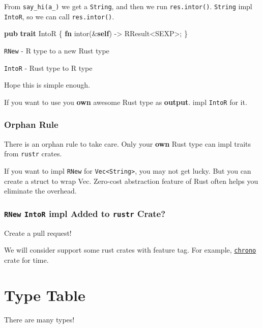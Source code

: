 \documentclass[]{book}
\newenvironment{Shaded}{\begin{snugshade}}{\end{snugshade}}
\newcommand{\KeywordTok}[1]{\textcolor[rgb]{0.13,0.29,0.53}{\textbf{{#1}}}}
\newcommand{\NormalTok}[1]{{#1}}
\begin{document}
From \texttt{say\_hi(a\_)} we get a \texttt{String}, and then we run
\texttt{res.intor()}. \texttt{String} impl \texttt{IntoR}, so we can
call \texttt{res.intor()}.

\begin{Shaded}
\begin{Highlighting}[]
\KeywordTok{pub} \KeywordTok{trait} \NormalTok{IntoR \{}
    \KeywordTok{fn} \NormalTok{intor(&}\KeywordTok{self}\NormalTok{) -> RResult<SEXP>;}
\NormalTok{\}}
\end{Highlighting}
\end{Shaded}

\texttt{RNew} - R type to a new Rust type

\texttt{IntoR} - Rust type to R type

Hope this is simple enough.

If you want to use you \textbf{own} awesome Rust type as
\textbf{output}. impl \texttt{IntoR} for it.

\subsection{Orphan Rule}\label{orphan-rule}

There is an orphan rule to take care. Only your \textbf{own} Rust type
can impl traits from \texttt{rustr} crates.

If you want to impl \texttt{RNew} for
\texttt{Vec\textless{}String\textgreater{}}, you may not get lucky. But
you can create a struct to wrap Vec. Zero-cost abstraction feature of
Rust often helps you eliminate the overhead.

\subsection{\texorpdfstring{\texttt{RNew} \texttt{IntoR} impl Added to
\texttt{rustr}
Crate?}{RNew IntoR impl Added to rustr Crate?}}\label{rnew-intor-impl-added-to-rustr-crate}

Create a pull request!

We will consider support some rust crates with feature tag. For example,
\href{https://github.com/lifthrasiir/rust-chrono}{\texttt{chrono}} crate
for time.

\chapter{Type Table}\label{type-table}

There are many types!
\end{document}
